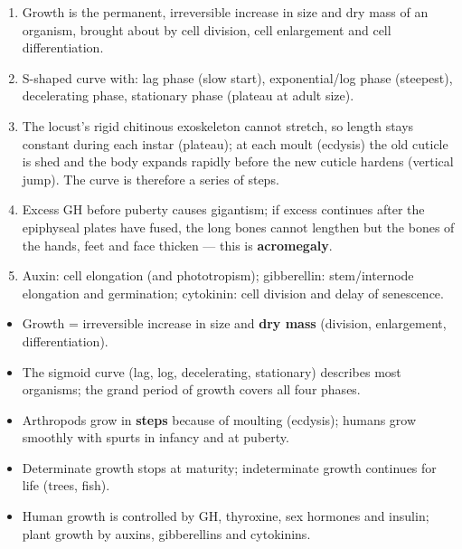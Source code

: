 \documentclass[11pt]{article}
\begin{document}
\begin{corrige}
\begin{enumerate}
\item Growth is the permanent, irreversible increase in size and dry mass of an organism, brought about by cell division, cell enlargement and cell differentiation.
\item S-shaped curve with: lag phase (slow start), exponential/log phase (steepest), decelerating phase, stationary phase (plateau at adult size).
\item The locust's rigid chitinous exoskeleton cannot stretch, so length stays constant during each instar (plateau); at each moult (ecdysis) the old cuticle is shed and the body expands rapidly before the new cuticle hardens (vertical jump). The curve is therefore a series of steps.
\item Excess GH before puberty causes gigantism; if excess continues after the epiphyseal plates have fused, the long bones cannot lengthen but the bones of the hands, feet and face thicken --- this is \textbf{acromegaly}.
\item Auxin: cell elongation (and phototropism); gibberellin: stem/internode elongation and germination; cytokinin: cell division and delay of senescence.
\end{enumerate}
\end{corrige}

\begin{aretenir}
\begin{itemize}
\item Growth = irreversible increase in size and \textbf{dry mass} (division, enlargement, differentiation).
\item The sigmoid curve (lag, log, decelerating, stationary) describes most organisms; the grand period of growth covers all four phases.
\item Arthropods grow in \textbf{steps} because of moulting (ecdysis); humans grow smoothly with spurts in infancy and at puberty.
\item Determinate growth stops at maturity; indeterminate growth continues for life (trees, fish).
\item Human growth is controlled by GH, thyroxine, sex hormones and insulin; plant growth by auxins, gibberellins and cytokinins.
\end{itemize}
\end{aretenir}

\newpage
\end{document}
